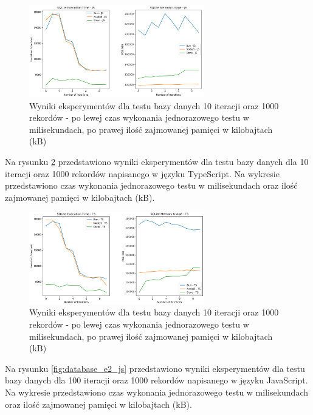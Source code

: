 \begin{figure}[H]
  \centering
  \includegraphics[width=0.68\textwidth]{Figures/database/sqlite_10_1000_js.png}
  \caption{Wyniki eksperymentów dla testu bazy danych 10 iteracji oraz 1000 rekordów - po lewej czas wykonania jednorazowego testu w milisekundach, po prawej ilość zajmowanej pamięci w kilobajtach (kB)}
  \label{fig:database_e1_js}
\end{figure}

Na rysunku \ref{fig:database_e1_ts} przedstawiono wyniki eksperymentów dla testu bazy danych dla 10 iteracji oraz 1000 rekordów napisanego w języku TypeScript. Na wykresie przedstawiono czas wykonania jednorazowego testu w milisekundach oraz ilość zajmowanej pamięci w kilobajtach (kB).

\begin{figure}[H]
  \centering
  \includegraphics[width=0.68\textwidth]{Figures/database/sqlite_10_1000_ts.png}
  \caption{Wyniki eksperymentów dla testu bazy danych 10 iteracji oraz 1000 rekordów - po lewej czas wykonania jednorazowego testu w milisekundach, po prawej ilość zajmowanej pamięci w kilobajtach (kB)}
  \label{fig:database_e1_ts}
\end{figure}

Na rysunku \ref{fig:database_e2_js} przedstawiono wyniki eksperymentów dla testu bazy danych dla 100 iteracji oraz 1000 rekordów napisanego w języku JavaScript. Na wykresie przedstawiono czas wykonania jednorazowego testu w milisekundach oraz ilość zajmowanej pamięci w kilobajtach (kB).

